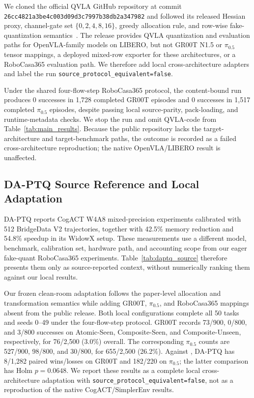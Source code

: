 We cloned the official QVLA GitHub repository at commit \texttt{26cc4821a3be4c003d09d3c7997b38db2a347982} and followed its released Hessian proxy, channel-gate set $\{0,2,4,8,16\}$, greedy allocation rule, and row-wise fake-quantization semantics~\cite{xu2026qvla}. The release provides QVLA quantization and evaluation paths for OpenVLA-family models on LIBERO, but not GR00T N1.5 or $\pi_{0.5}$ tensor mappings, a deployed mixed-row exporter for these architectures, or a RoboCasa365 evaluation path. We therefore add local cross-architecture adapters and label the run \texttt{source\_protocol\_equivalent=false}.

Under the shared four-flow-step RoboCasa365 protocol, the content-bound run produces 0 successes in 1,728 completed GR00T episodes and 0 successes in 1,517 completed $\pi_{0.5}$ episodes, despite passing local source-parity, pack-loading, and runtime-metadata checks. We stop the run and omit QVLA-code from Table~\ref{tab:main_results}. Because the public repository lacks the target-architecture and target-benchmark paths, the outcome is recorded as a failed cross-architecture reproduction; the native OpenVLA/LIBERO result is unaffected.

\subsection{DA-PTQ Source Reference and Local Adaptation}
\label{sec:daptq_source}

DA-PTQ reports CogACT W4A8 mixed-precision experiments calibrated with 512 BridgeData V2 trajectories, together with 42.5\% memory reduction and 54.8\% speedup in its WidowX setup. These measurements use a different model, benchmark, calibration set, hardware path, and accounting scope from our eager fake-quant RoboCasa365 experiments. Table~\ref{tab:daptq_source} therefore presents them only as source-reported context, without numerically ranking them against our local results.

Our frozen clean-room adaptation follows the paper-level allocation and transformation semantics while adding GR00T, $\pi_{0.5}$, and RoboCasa365 mappings absent from the public release. Both local configurations complete all 50 tasks and seeds 0--49 under the four-flow-step protocol. GR00T records 73/900, 0/800, and 3/800 successes on Atomic-Seen, Composite-Seen, and Composite-Unseen, respectively, for 76/2,500 (3.0\%) overall. The corresponding $\pi_{0.5}$ counts are 527/900, 98/800, and 30/800, for 655/2,500 (26.2\%). Against \method, DA-PTQ has 8/1,282 paired wins/losses on GR00T and 182/220 on $\pi_{0.5}$; the latter comparison has Holm $p=0.0648$. We report these results as a complete local cross-architecture adaptation with \texttt{source\_protocol\_equivalent=false}, not as a reproduction of the native CogACT/SimplerEnv results.

